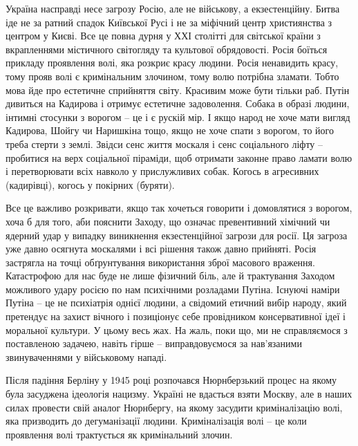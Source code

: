 Україна насправді несе загрозу Росію, але не військову, а екзестенційну. Битва
іде не за ратний спадок Київської Русі і не за міфічний центр християнства з
центром у Києві. Все це повна дурня у ХХІ столітті для світської країни з
вкрапленнями містичного світогляду та культової обрядовості. Росія боїться
прикладу проявлення волі, яка розкриє красу людини. Росія ненавидить красу,
тому прояв волі є кримінальним злочином, тому волю потрібна зламати. Тобто мова
йде про естетичне сприйняття світу. Красивим може бути тільки раб. Путін
дивиться на Кадирова і отримує естетичне задоволення. Собака в образі людини,
інтимні стосунки з ворогом – це і є рускій мір. І якщо народ не хоче мати
вигляд Кадирова, Шойгу чи Наришкіна тощо, якщо не хоче спати з ворогом, то його
треба стерти з землі. Звідси сенс життя москаля і сенс соціального ліфту –
пробитися на верх соціальної піраміди, щоб отримати законне право ламати волю і
перетворювати всіх навколо у прислужливих собак. Когось в агресивних
(кадирівці), когось у покірних (буряти).

Все це важливо розкривати, якщо так хочеться говорити і домовлятися з ворогом,
хоча б для того, аби пояснити Заходу, що означає превентивний хімічний чи
ядерний удар у випадку виникнення екзестенційної загрози для росії. Ця загроза
уже давно осягнута москалями і всі рішення також давно прийняті. Росія
застрягла на точці обґрунтування використання зброї масового враження.
Катастрофою для нас буде не лише фізичний біль, але й трактування Заходом
можливого удару росією по нам психічними розладами Путіна. Існуючі наміри
Путіна – це не психіатрія однієї людини, а свідомий етичний вибір народу, який
претендує на захист вічного і позиціонує себе провідником консервативної ідеї і
моральної культури. У цьому весь жах. На жаль, поки що, ми не справляємося з
поставленою задачею, навіть гірше – виправдовуємося за нав'язаними
звинуваченнями у військовому нападі. 

Після падіння Берліну у 1945 році розпочався Нюрнберзький процес на якому була
засуджена ідеологія нацизму. Україні не вдасться взяти Москву, але в наших
силах провести свій аналог Нюрнбергу, на якому засудити криміналізацію волі,
яка призводить до дегуманізації людини. Криміналізація волі – це коли
проявлення волі трактується як кримінальний злочин.
